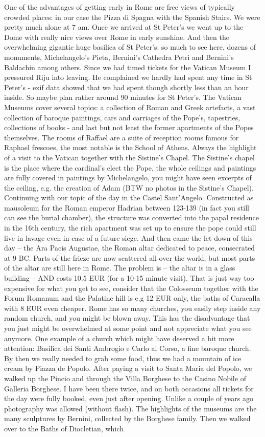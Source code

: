 One of the advantages of getting early in Rome are free views of typically crowded places: in our case the Pizza di Spagna with the Spanish Stairs. We were pretty much alone at 7 am. Once we arrived at St Peter's we went up to the Dome with really nice views over Rome in early sunshine. And then the overwhelming gigantic huge basilica of St Peter's: so much to see here, dozens of monuments, Michelangelo's Pieta, Bernini's Cathedra Petri and Bernini's Baldachin among others. Since we had timed tickets for the Vatican Museum I pressured Riju into leaving. He complained we hardly had spent any time in St Peter's - exif data showed that we had spent though shortly less than an hour inside. So maybe plan rather around 90 minutes for St Peter's. The Vatican Museums cover several topics: a collection of Roman and Greek artefacts, a vast collection of baroque paintings, cars and carriages of the Pope's, tapestries, collections of books - and last but not least the former apartments of the Popes themselves. The rooms of Raffael are  a suite of reception rooms famous for Raphael frescoes, the most notable is the School of Athens. Always the highlight of a visit to the Vatican together with the Sistine's Chapel. The Sistine's chapel is the place where the cardinal's elect the Pope, the whole ceilings and paintings are fully covered in paintings by Michelangelo, you might have seen excerpts of the ceiling, e.g. the creation of Adam (BTW no photos in the Sistine's Chapel). Continuing with our topic of the day in the Castel Sant'Angelo. Constructed as mausoleum for the Roman emperor Hadrian between 123-139 (in fact you still can see the burial chamber), the structure was converted into the papal residence in the 16th century, the rich apartment was set up to ensure the pope could still live in lavage even in case of a future siege. And then came the let down of this day -- the Ara Pacis Augustae, the Roman altar dedicated to peace, consecrated at 9 BC. Parts of the frieze are now scattered all over the world, but most parts of the altar are still here in Rome. The problem is -- the altar is in a glass building -- AND costs 10.5 EUR (for a 10-15 minute visit). That is just way too expensive for what you get to see, consider that the Colosseum together with the Forum Romanum and the Palatine hill is e.g 12 EUR only, the baths of Caracalla with 8 EUR even cheaper. Rome has so many churches, you easily step inside any random church, and you might be blown away. This has the disadvantage that you just might be overwhelmed at some point and not appreciate what you see anymore. One example of a church which might have deserved a bit more attention: Basilica dei Santi Ambrogio e Carlo al Corso, a fine baroque church. By then we really needed to grab some food, thus we had a mountain of ice cream by Piazza de Popolo. After paying a visit to Santa Maria del Popolo, we walked up the Pincio and through the Villa Borghese to the Casino Nobile of Galleria Borghese. I have been there twice, and on both occasions all tickets for the day were fully booked, even just after opening. Unlike a couple of years ago photography was allowed (without flash). The highlights of the museums are the many sculptures by Bernini, collected by the Borghese family. Then we walked over to the Baths of Diocletian, which 